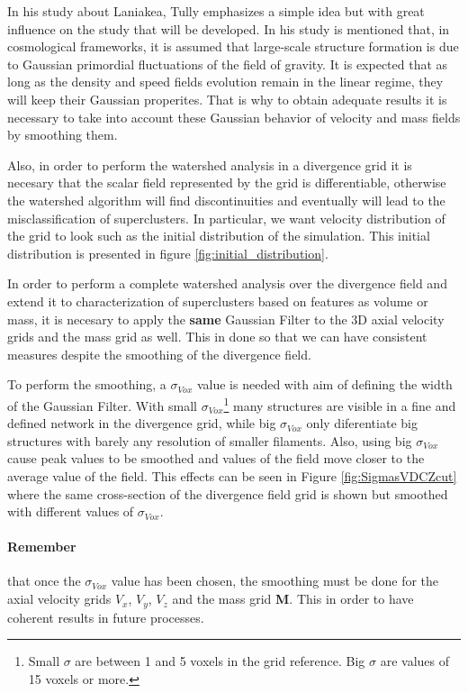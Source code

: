 \documentclass[usenatbib]{mnras}
\begin{document}
In his study about Laniakea, Tully\cite{tully_laniakea_2014}
emphasizes a simple idea but with great influence on the study that
will be developed. In his study is mentioned that, in cosmological
frameworks, it is assumed that large-scale structure formation is due
to Gaussian primordial fluctuations of the field of gravity. It is
expected that as long as the density and speed fields evolution remain
in the linear regime, they will keep their Gaussian properites. That
is why to obtain adequate results it is necessary to take into account
these Gaussian behavior of velocity and mass fields by smoothing
them. 

Also, in order to perform the watershed analysis in a divergence grid
it is necesary that the scalar field represented by the grid is
differentiable, otherwise the watershed algorithm will find
discontinuities and eventually will lead to the misclassification of
superclusters. In particular, we want velocity distribution of the
grid to look such as the initial distribution of the simulation. This
initial distribution is presented in figure
\ref{fig:initial_distribution}. 

In order to perform a complete watershed analysis over the divergence
field and extend it to characterization of superclusters based on
features as volume or mass,  it is necesary to apply the
\textbf{same} Gaussian Filter to the 3D axial velocity grids and the
mass grid as well. This in done so that we can have consistent
measures despite the smoothing of the divergence field. 




To perform the smoothing, a $\sigma_{Vox}$ value is needed with aim of defining the width of the Gaussian Filter. With small $\sigma_{Vox}$\footnote{Small $\sigma$ are between 1 and 5 voxels in the grid reference. Big $\sigma$ are values of 15 voxels or more.} many structures are visible in a fine and defined network in the divergence grid, while big $\sigma_{Vox}$ only diferentiate big structures with barely any resolution of smaller filaments. Also, using big $\sigma_{Vox}$ cause peak values to be smoothed and values of the field move closer to  the average value of the field. This effects can be seen in Figure \ref{fig:SigmasVDCZcut} where the same cross-section of the divergence field grid is shown but smoothed with different values of $\sigma_{Vox}$.



\paragraph{Remember}  that once the $\sigma_{Vox}$ value has been chosen, the smoothing must be done for the axial velocity grids $V_x$, $V_y$, $V_z$ and the mass grid \textbf{M}. This in order to have coherent results in future processes.
\end{document}
